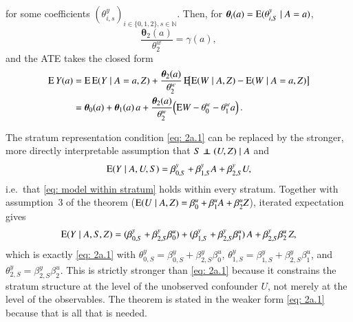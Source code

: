 \begin{theorem}[Extension 1]
\begin{enumerate}[label=\textup{(\alph*)}]
for some coefficients $(\theta^y_{i,s})_{i \in \{0,1,2\}, s \in \mathbb{N}}$. Then, for $\boldsymbol{\theta}_i (a) = \mathrm{E} (\theta_{i,S}^{y} \mid A = a)$,
\[
\frac{\boldsymbol{\theta}_2(a)}{\theta_2^w} = \gamma(a),
\]
and the ATE takes the closed form
    \begin{align}\label{eq: expression for ATE first model}
        \mathrm{E} \, Y(a)
        &= \mathrm{E}\,\mathrm{E}(Y \mid A=a,Z) + \frac{\boldsymbol{\theta}_2(a)}{\theta_2^w}\,\mathrm{E}\!\big[\mathrm{E}(W \mid A,Z)-\mathrm{E}(W \mid A=a,Z)\big] \nonumber\\
        &= \boldsymbol{\theta}_0(a) + \boldsymbol{\theta}_1(a)\,a + \frac{\boldsymbol{\theta}_2(a)}{\theta_2^w}\!\left(\mathrm{E} W - \theta_0^w - \theta_1^w a\right).
    \end{align}
\end{enumerate}
\end{theorem}

\begin{remark}
The stratum representation condition \eqref{eq: 2a.1} can be replaced by the stronger, more directly interpretable assumption that $S \independent (U,Z) \mid A$ and
\[
\mathrm{E}(Y \mid A,U,S) = \beta_{0,S}^{y} + \beta_{1,S}^{y} A + \beta_{2,S}^{y} U,
\]
i.e.\ that \eqref{eq: model within stratum} holds within every stratum. Together with assumption~3 of the theorem ($\mathrm{E}(U\mid A,Z) = \beta_0^u + \beta_1^u A + \beta_2^u Z$), iterated expectation gives
\[
\mathrm{E}(Y \mid A,S,Z) = (\beta_{0,S}^y + \beta_{2,S}^y\beta_0^u) + (\beta_{1,S}^y + \beta_{2,S}^y\beta_1^u)\,A + \beta_{2,S}^y\beta_2^u\,Z,
\]
which is exactly \eqref{eq: 2a.1} with $\theta_{0,S}^y = \beta_{0,S}^y + \beta_{2,S}^y\beta_0^u$, $\theta_{1,S}^y = \beta_{1,S}^y + \beta_{2,S}^y\beta_1^u$, and $\theta_{2,S}^y = \beta_{2,S}^y\beta_2^u$. This is strictly stronger than \eqref{eq: 2a.1} because it constrains the stratum structure at the level of the unobserved confounder $U$, not merely at the level of the observables. The theorem is stated in the weaker form \eqref{eq: 2a.1} because that is all that is needed.
\end{remark}


